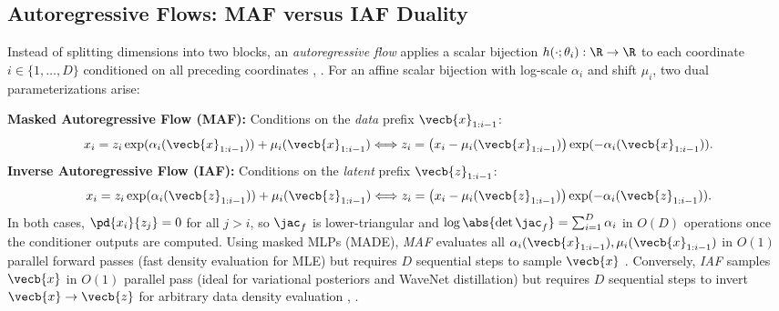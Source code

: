 \documentclass[../../../../master.tex]{subfiles}
\begin{document}
\subsection{Autoregressive Flows: MAF versus IAF Duality}

Instead of splitting dimensions into two blocks, an \emph{autoregressive flow} applies a scalar bijection $h(\cdot; \theta_i) : \R \to \R$ to each coordinate $i \in \{1, \dots, D\}$ conditioned on all preceding coordinates , . For an affine scalar bijection with log-scale $\alpha_i$ and shift $\mu_i$, two dual parameterizations arise:

\begin{coremath}
\textbf{Masked Autoregressive Flow (MAF):} Conditions on the \emph{data} prefix $\vecb{x}_{1:i-1}$:
\begin{equation}\label{eq:flow:maf}
  x_i = z_i \exp(\alpha_i(\vecb{x}_{1:i-1})) + \mu_i(\vecb{x}_{1:i-1}) \Longleftrightarrow z_i = \left(x_i - \mu_i(\vecb{x}_{1:i-1})\right)\exp(-\alpha_i(\vecb{x}_{1:i-1})).
\end{equation}
\textbf{Inverse Autoregressive Flow (IAF):} Conditions on the \emph{latent} prefix $\vecb{z}_{1:i-1}$:
\begin{equation}\label{eq:flow:iaf}
  x_i = z_i \exp(\alpha_i(\vecb{z}_{1:i-1})) + \mu_i(\vecb{z}_{1:i-1}) \Longleftrightarrow z_i = \left(x_i - \mu_i(\vecb{z}_{1:i-1})\right)\exp(-\alpha_i(\vecb{z}_{1:i-1})).
\end{equation}
In both cases, $\pd{x_i}{z_j} = 0$ for all $j > i$, so $\jac_f$ is lower-triangular and $\log\abs{\det\jac_f} = \sum_{i=1}^D \alpha_i$ in $O(D)$ operations once the conditioner outputs are computed. Using masked MLPs (MADE), \emph{MAF} evaluates all $\alpha_i(\vecb{x}_{1:i-1}), \mu_i(\vecb{x}_{1:i-1})$ in $O(1)$ parallel forward passes (fast density evaluation for MLE) but requires $D$ sequential steps to sample $\vecb{x}$ . Conversely, \emph{IAF} samples $\vecb{x}$ in $O(1)$ parallel pass (ideal for variational posteriors and WaveNet distillation) but requires $D$ sequential steps to invert $\vecb{x} \to \vecb{z}$ for arbitrary data density evaluation , .
\end{coremath}
\end{document}
